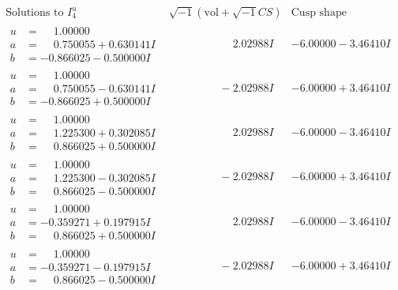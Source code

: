 \documentclass[1p]{elsarticle_modified}
\theoremstyle{definition}
\newcommand{\I}{\sqrt{-1}}
\begin{document}
$$\begin{array}{c|c|c}  
\text{Solutions to }I^u_{4}& \I (\text{vol} + \sqrt{-1}CS) & \text{Cusp shape}\\
 \hline 
\begin{aligned}
u &= \phantom{-}1.00000\phantom{ +0.000000I} \\
a &= \phantom{-}0.750055 + 0.630141 I \\
b &= -0.866025 - 0.500000 I\end{aligned}
 & \phantom{-0.000000 -}2.02988 I & -6.00000 - 3.46410 I \\ \hline\begin{aligned}
u &= \phantom{-}1.00000\phantom{ +0.000000I} \\
a &= \phantom{-}0.750055 - 0.630141 I \\
b &= -0.866025 + 0.500000 I\end{aligned}
 & \phantom{-0.000000 } -2.02988 I & -6.00000 + 3.46410 I \\ \hline\begin{aligned}
u &= \phantom{-}1.00000\phantom{ +0.000000I} \\
a &= \phantom{-}1.225300 + 0.302085 I \\
b &= \phantom{-}0.866025 + 0.500000 I\end{aligned}
 & \phantom{-0.000000 -}2.02988 I & -6.00000 - 3.46410 I \\ \hline\begin{aligned}
u &= \phantom{-}1.00000\phantom{ +0.000000I} \\
a &= \phantom{-}1.225300 - 0.302085 I \\
b &= \phantom{-}0.866025 - 0.500000 I\end{aligned}
 & \phantom{-0.000000 } -2.02988 I & -6.00000 + 3.46410 I \\ \hline\begin{aligned}
u &= \phantom{-}1.00000\phantom{ +0.000000I} \\
a &= -0.359271 + 0.197915 I \\
b &= \phantom{-}0.866025 + 0.500000 I\end{aligned}
 & \phantom{-0.000000 -}2.02988 I & -6.00000 - 3.46410 I \\ \hline\begin{aligned}
u &= \phantom{-}1.00000\phantom{ +0.000000I} \\
a &= -0.359271 - 0.197915 I \\
b &= \phantom{-}0.866025 - 0.500000 I\end{aligned}
 & \phantom{-0.000000 } -2.02988 I & -6.00000 + 3.46410 I \\ \hline\begin{aligned}

\end{aligned}
\end{array}$$
\end{document}
